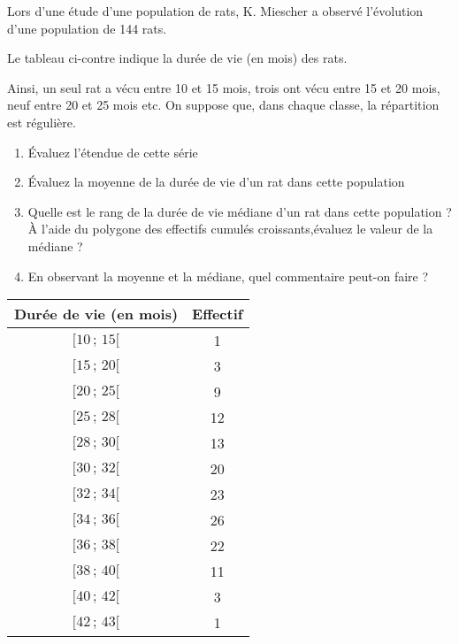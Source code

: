 \begin{exo}
Lors d'une étude d'une population de rats, K. Miescher a observé l'évolution d'une population de 144 rats. 

Le tableau ci-contre indique la durée de vie (en mois) des rats.

Ainsi, un seul rat a vécu entre 10 et 15 mois, trois ont vécu entre 15 et 20 mois, neuf entre 20 et 25 mois etc.
On suppose que, dans chaque classe, la répartition est régulière.
\begin{enumerate}
	\item \'Evaluez l'étendue de cette série
	\item \'Evaluez la moyenne de la durée de vie d'un rat dans cette population
	\item Quelle est le rang de la durée de vie m\'ediane d'un rat dans cette population ?\\
	      \`A l'aide du polygone des effectifs cumul\'es croissants,\'evaluez le valeur de la
médiane ?
\item En observant la moyenne et la médiane, quel commentaire peut-on faire ?
\end{enumerate}

\begin{center}
\begin{tabular}{|c|c|}
\hline
Durée de vie (en mois) & Effectif \\ \hline
$[10\,;\,15[$ & 1 \\ \hline
$[15\,;\,20[$ & 3 \\ \hline
$[20\,;\,25[$ & 9 \\ \hline
$[25\,;\,28[$ & 12 \\ \hline
$[28\,;\,30[$ & 13 \\ \hline
$[30\,;\,32[$ & 20 \\ \hline
$[32\,;\,34[$ & 23 \\ \hline
$[34\,;\,36[$ & 26 \\ \hline
$[36\,;\,38[$ & 22 \\ \hline
$[38\,;\,40[$ & 11 \\ \hline
$[40\,;\,42[$ & 3 \\ \hline
$[42\,;\,43[$ & 1 \\ \hline
\end{tabular}
\end{center}%
\end{exo}









